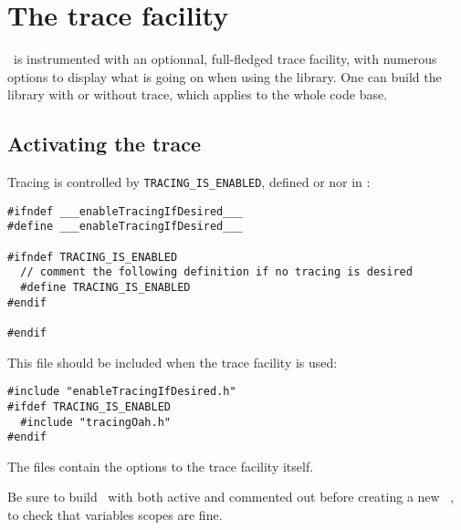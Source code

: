 
\chapter{The trace facility}


\mf\ is instrumented with an optionnal, full-fledged trace facility, with numerous options to display what is going on when using the library.
One can build the library with or without trace, which applies to the whole code base.

\section{Activating the trace}

Tracing is controlled by {\tt TRACING_IS_ENABLED}, defined or nor in :

\begin{lstlisting}[language=CPlusPlus]
#ifndef ___enableTracingIfDesired___
#define ___enableTracingIfDesired___

#ifndef TRACING_IS_ENABLED
  // comment the following definition if no tracing is desired
  #define TRACING_IS_ENABLED
#endif

#endif
\end{lstlisting}

This file should be included when the trace facility is used:
\begin{lstlisting}[language=CPlusPlus]
#include "enableTracingIfDesired.h"
#ifdef TRACING_IS_ENABLED
  #include "tracingOah.h"
#endif
\end{lstlisting}

The files  contain the options to the trace facility itself.

Be sure to build \mf\ with  both active and commented out before creating a new  \version\ \branch, to check that variables scopes are fine.

